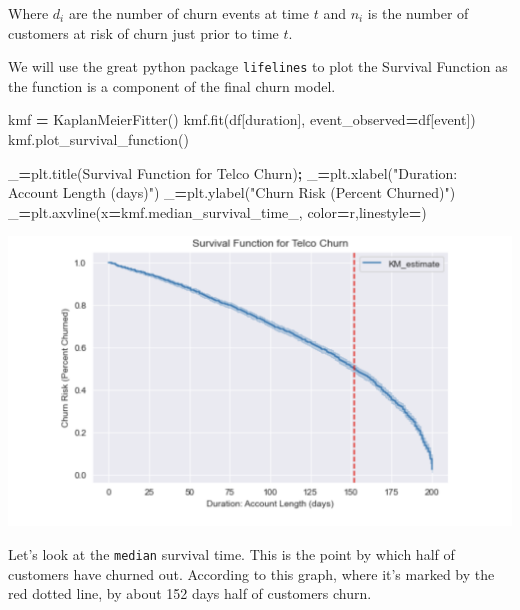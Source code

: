 \documentclass[
]{book}
\newenvironment{Shaded}{\begin{snugshade}}{\end{snugshade}}
\newcommand{\NormalTok}[1]{#1}
\newcommand{\OperatorTok}[1]{\textcolor[rgb]{0.81,0.36,0.00}{\textbf{#1}}}
\newcommand{\StringTok}[1]{\textcolor[rgb]{0.31,0.60,0.02}{#1}}
\begin{document}
Where \(𝑑_𝑖\) are the number of churn events at time \(𝑡\) and \(𝑛_𝑖\) is the number of customers at risk of churn just prior to time \(𝑡\).

We will use the great python package \texttt{lifelines} to plot the Survival Function as the function is a component of the final churn model.

\begin{Shaded}
\begin{Highlighting}[]
\NormalTok{kmf }\OperatorTok{=}\NormalTok{ KaplanMeierFitter()}
\NormalTok{kmf.fit(df[}\StringTok{\textquotesingle{}duration\textquotesingle{}}\NormalTok{], event\_observed}\OperatorTok{=}\NormalTok{df[}\StringTok{\textquotesingle{}event\textquotesingle{}}\NormalTok{])}
\NormalTok{kmf.plot\_survival\_function()}

\NormalTok{\_}\OperatorTok{=}\NormalTok{plt.title(}\StringTok{\textquotesingle{}Survival Function for Telco Churn\textquotesingle{}}\NormalTok{)}\OperatorTok{;}\NormalTok{ \_}\OperatorTok{=}\NormalTok{plt.xlabel(}\StringTok{"Duration: Account Length (days)"}\NormalTok{)}
\NormalTok{\_}\OperatorTok{=}\NormalTok{plt.ylabel(}\StringTok{"Churn Risk (Percent Churned)"}\NormalTok{) }
\NormalTok{\_}\OperatorTok{=}\NormalTok{plt.axvline(x}\OperatorTok{=}\NormalTok{kmf.median\_survival\_time\_, color}\OperatorTok{=}\StringTok{\textquotesingle{}r\textquotesingle{}}\NormalTok{,linestyle}\OperatorTok{=}\StringTok{\textquotesingle{}{-}{-}\textquotesingle{}}\NormalTok{)}
\end{Highlighting}
\end{Shaded}

\includegraphics{figs/churn5.png}

Let's look at the \texttt{median} survival time. This is the point by which half of customers have churned out. According to this graph, where it's marked by the red dotted line, by about 152 days half of customers churn.
\end{document}
